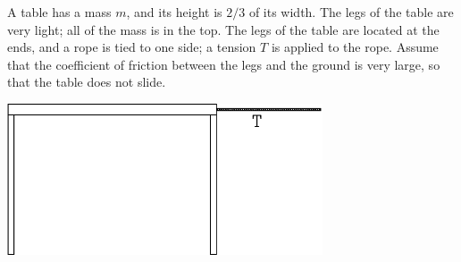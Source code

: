 \documentclass[12pt]{article}
\begin{document}
%
%
%
%
%
%
%
%
%
%

\newpage

\begin{minipage}{0.5\textwidth}
A table has a mass $m$, and its height is $2/3$ of its width. The legs of the table are very light; all of the mass is in the top.
The legs of the table are located at the ends, and a rope is tied to one side; a tension $T$ is applied to the rope. Assume that the coefficient of friction between
the legs and the ground is very large, so that the table does not slide.
\end{minipage}
\begin{minipage}{0.5\textwidth}
\begin{center}
\includegraphics[width=0.7\textwidth]{table-crop.pdf}
\end{center}
\end{minipage}
\end{document}
